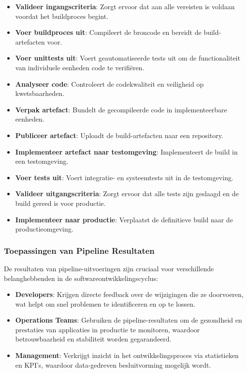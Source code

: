 \begin{itemize}
    \item \textbf{Valideer ingangscriteria}: Zorgt ervoor dat aan alle vereisten is voldaan voordat het buildproces begint.
    \item \textbf{Voer buildproces uit}: Compileert de broncode en bereidt de build-\-arte\-facten voor.
    \item \textbf{Voer unittests uit}: Voert geautomatiseerde tests uit om de functionaliteit van individuele eenheden code te verifiëren.
    \item \textbf{Analyseer code}: Controleert de codekwaliteit en veiligheid op kwetsbaarheden.
    \item \textbf{Verpak artefact}: Bundelt de gecompileerde code in implementeerbare eenheden.
    \item \textbf{Publiceer artefact}: Uploadt de build-\-arte\-facten naar een repository.
    \item \textbf{Implementeer artefact naar testomgeving}: Implementeert de build in een testomgeving.
    \item \textbf{Voer tests uit}: Voert integratie- en systeemtests uit in de testomgeving.
    \item \textbf{Valideer uitgangscriteria}: Zorgt ervoor dat alle tests zijn geslaagd en de build gereed is voor productie.
    \item \textbf{Implementeer naar productie}: Verplaatst de definitieve build naar de productieomgeving.
\end{itemize}


\subsubsection{Toepassingen van Pipeline Resultaten}

De resultaten van pipeline-uitvoeringen zijn cruciaal voor verschillende belanghebbenden in de softwareontwikkelingscyclus:

\begin{itemize}
    \item \textbf{Developers}: Krijgen directe feedback over de wijzigingen die ze doorvoeren, wat helpt om snel problemen te identificeren en op te lossen.
    \item \textbf{Operations Teams}: Gebruiken de pipeline-resultaten om de gezondheid en prestaties van applicaties in productie te monitoren, waardoor betrouwbaarheid en stabiliteit worden gegarandeerd.
    \item \textbf{Management}: Verkrijgt inzicht in het ontwikkelingsproces via statistieken en KPI's, waardoor data-gedreven besluitvorming mogelijk wordt.
\end{itemize}

